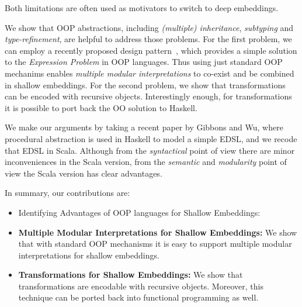 \noindent Both limitations are often used as motivators to switch to deep embeddings.

We show that OOP abstractions, including \emph{(multiple)
  inheritance}, \emph{subtyping} and \emph{type-refinement}, are
helpful to address those problems. For the first problem, we can
employ a recently proposed design pattern~\cite{}, which provides a simple
solution to the \emph{Expression Problem}\cite{} in OOP languages. Thus
using just standard OOP mechanims enables \emph{multiple modular
  interpretations} to co-exist and be combined in shallow embeddings.
For the second problem, we show that transformations can be encoded 
with recursive objects. Interestingly enough, for transformations it
is possible to port back the OO solution to Haskell. 

We make our arguments by taking a recent paper by Gibbons and Wu,
where procedural abstraction is used in Haskell to model a simple
EDSL, and we recode that EDSL in Scala. Although from the
\emph{syntactical} point of view there are minor inconveniences in
the Scala version, from the \emph{semantic} and \emph{modularity} point of view the
Scala version has clear advantages.

In summary, our contributions are:

\begin{itemize}

\item {Identifying Advantages of OOP languages for Shallow Embeddings:}

\item {\bf Multiple Modular Interpretations for Shallow Embeddings:} 
  We show that with standard OOP mechanisms it is easy to support multiple modular
  interpretations for shallow embeddings.

\item {\bf Transformations for Shallow Embeddings:} We show that
  transformations are encodable with recursive objects. Moreover, this technique
  can be ported back into functional programming as well.

\end{itemize}